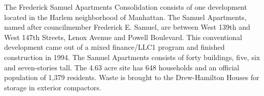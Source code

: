 The Frederick Samuel Apartments Consolidation consists of one development located in the Harlem neighborhood of Manhattan. The Samuel Apartments, named after councilmember Frederick E. Samuel,  are between West 139th and West 147th Streets, Lenox Avenue and Powell Boulevard. This conventional development came out of a mixed finance/LLC1 program and finished construction in 1994. The Samuel Apartments consists of forty buildings, five, six and seven-stories tall. The 4.63 acre site has 648 households and an official population of 1,379 residents. Waste is brought to the Drew-Hamilton Houses for storage in exterior compactors.